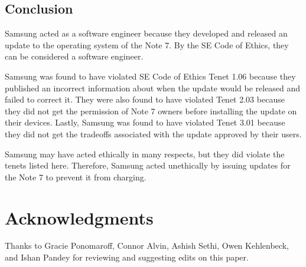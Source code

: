 \documentclass[12pt]{article}
\begin{document}
      

\subsection{Conclusion}
Samsung acted as a software engineer because they developed and released an update to the operating system of the Note 7. By the SE Code of Ethics, they can be considered a software engineer.

Samsung was found to have violated SE Code of Ethics Tenet 1.06 because they published an incorrect information about when the update would be released and failed to correct it. They were also found to have violated Tenet 2.03 because they did not get the permission of Note 7 owners before installing the update on their devices. Lastly, Samsung was found to have violated Tenet 3.01 because they did not get the tradeoffs associated with the update approved by their users.

Samsung may have acted ethically in many respects, but they did violate the tenets listed here. Therefore, Samsung acted unethically by issuing updates for the Note 7 to prevent it from charging.

\section{Acknowledgments}

Thanks to Gracie Ponomaroff, Connor Alvin, Ashish Sethi, Owen Kehlenbeck, and Ishan Pandey for reviewing and suggesting edits on this paper.

\nocite{*}

\onecolumn
\newpage
{}	


\end{document}
